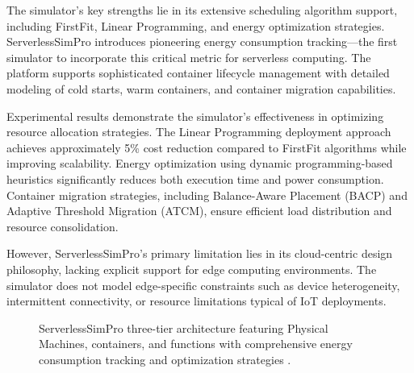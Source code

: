 The simulator's key strengths lie in its extensive scheduling algorithm support, including FirstFit, Linear Programming, and energy optimization strategies. ServerlessSimPro introduces pioneering energy consumption tracking—the first simulator to incorporate this critical metric for serverless computing. The platform supports sophisticated container lifecycle management with detailed modeling of cold starts, warm containers, and container migration capabilities.

Experimental results demonstrate the simulator's effectiveness in optimizing resource allocation strategies. The Linear Programming deployment approach achieves approximately 5\% cost reduction compared to FirstFit algorithms while improving scalability. Energy optimization using dynamic programming-based heuristics significantly reduces both execution time and power consumption. Container migration strategies, including Balance-Aware Placement (BACP) and Adaptive Threshold Migration (ATCM), ensure efficient load distribution and resource consolidation.

However, ServerlessSimPro's primary limitation lies in its cloud-centric design philosophy, lacking explicit support for edge computing environments. The simulator does not model edge-specific constraints such as device heterogeneity, intermittent connectivity, or resource limitations typical of IoT deployments.

\begin{figure}[htbp]
\centering
{}
\caption{ServerlessSimPro three-tier architecture featuring Physical Machines, containers, and functions with comprehensive energy consumption tracking and optimization strategies \cite{das2022serverlesssimpro}.}
\label{fig:serverlesssimpro-architecture}
\end{figure}


